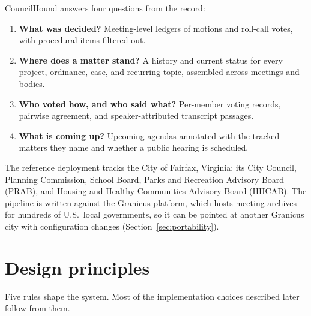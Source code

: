 \documentclass[11pt]{article}
\begin{document}
CouncilHound answers four questions from the record:
\begin{enumerate}
  \item \textbf{What was decided?} Meeting-level ledgers of motions and roll-call votes,
        with procedural items filtered out.
  \item \textbf{Where does a matter stand?} A history and current status for every
        project, ordinance, case, and recurring topic, assembled across meetings and bodies.
  \item \textbf{Who voted how, and who said what?} Per-member voting records, pairwise
        agreement, and speaker-attributed transcript passages.
  \item \textbf{What is coming up?} Upcoming agendas annotated with the tracked matters
        they name and whether a public hearing is scheduled.
\end{enumerate}

The reference deployment tracks the City of Fairfax, Virginia: its City Council,
Planning Commission, School Board, Parks and Recreation Advisory Board (PRAB), and
Housing and Healthy Communities Advisory Board (HHCAB). The pipeline is written against
the Granicus platform, which hosts meeting archives for hundreds of U.S.\ local
governments, so it can be pointed at another Granicus city with configuration changes
(Section~\ref{sec:portability}).

\section{Design principles}
\label{sec:principles}

Five rules shape the system. Most of the implementation choices described later follow from them.
\end{document}
